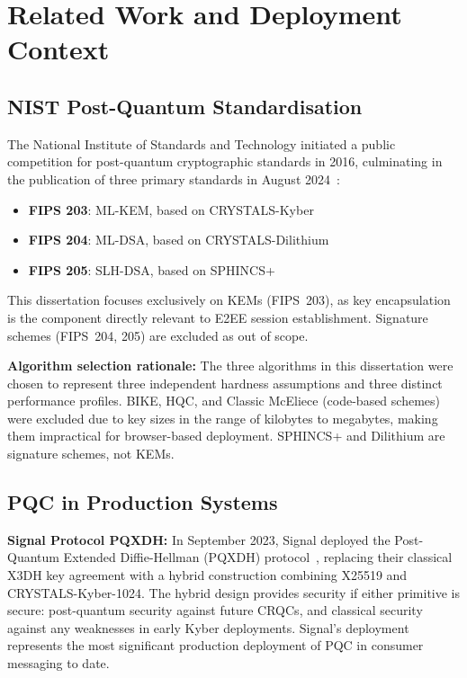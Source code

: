 \documentclass[12pt,a4paper]{report}
\begin{document}
\chapter{Related Work and Deployment Context}

\section{NIST Post-Quantum Standardisation}

The National Institute of Standards and Technology initiated a public competition for
post-quantum cryptographic standards in 2016, culminating in the publication of three
primary standards in August 2024~\cite{nist2024}:

\begin{itemize}
  \item \textbf{FIPS 203}: ML-KEM, based on CRYSTALS-Kyber~\cite{crystals_kyber_spec}
  \item \textbf{FIPS 204}: ML-DSA, based on CRYSTALS-Dilithium
  \item \textbf{FIPS 205}: SLH-DSA, based on SPHINCS+
\end{itemize}

This dissertation focuses exclusively on KEMs (FIPS~203), as key encapsulation is the
component directly relevant to E2EE session establishment. Signature schemes (FIPS~204,
205) are excluded as out of scope.

\textbf{Algorithm selection rationale:} The three algorithms in this dissertation were
chosen to represent three independent hardness assumptions and three distinct
performance profiles. BIKE, HQC, and Classic McEliece (code-based schemes) were
excluded due to key sizes in the range of kilobytes to megabytes, making them
impractical for browser-based deployment. SPHINCS+ and Dilithium are signature schemes,
not KEMs.

\section{PQC in Production Systems}

\textbf{Signal Protocol PQXDH:} In September 2023, Signal deployed the
Post-Quantum Extended Diffie-Hellman (PQXDH) protocol~\cite{signal_pqxdh}, replacing
their classical X3DH key agreement with a hybrid construction combining X25519 and
CRYSTALS-Kyber-1024. The hybrid design provides security if either primitive is
secure: post-quantum security against future CRQCs, and classical security against
any weaknesses in early Kyber deployments. Signal's deployment represents the most
significant production deployment of PQC in consumer messaging to date.
\end{document}
